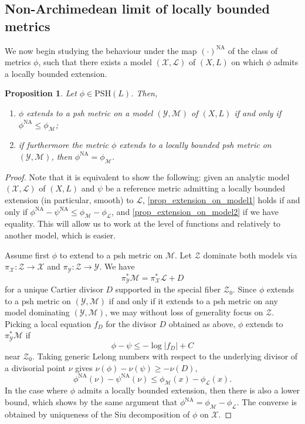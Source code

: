 \documentclass[JEP,XML,SOM,Unicode,NoEqCountersInSection,published]{cedram}
\newtheorem{prop}[theorem]{Proposition}
\theoremstyle{definition}
\newcommand\cL{\mathcal{L}}
\newcommand\cM{\mathcal{M}}
\newcommand\cX{\mathcal{X}}
\newcommand\cY{\mathcal{Y}}
\newcommand\cZ{\mathcal{Z}}
\newcommand\PSH{\mathrm{PSH}}
\newcommand\na{^{\mathrm{NA}}}
\begin{document}
\subsection{Non-Archimedean limit of locally bounded metrics}\label{subsect_25}

We now begin studying the behaviour under the map $(\cdot)\na$ of the class of metrics $\phi$, such that there exists a model $(\cX,\cL)$ of $(X,L)$ on which $\phi$ admits a locally bounded extension.

\begin{prop}\label{prop_extension_on_model}
Let $\phi\in\PSH(L)$. Then,
\begin{enumerate}
\item\label{prop_extension_on_model1} $\phi$ extends to a psh metric on a model $(\cY,\cM)$ of $(X,L)$ if and only if $\phi\na\leq \phi_\cM$;
\item\label{prop_extension_on_model2} if furthermore the metric $\phi$ extends to a locally bounded psh metric on $(\cY,\cM)$, then $\phi\na=\phi_\cM$.
\end{enumerate}
\end{prop}
\begin{proof}
Note that it is equivalent to show the following: given an analytic model $(\cX,\cL)$ of $(X,L)$ and $\psi$ be a reference metric admitting a locally bounded extension (in particular, smooth) to $\cL$,
\eqref{prop_extension_on_model1} holds if and only if $\phi\na-\psi\na\leq \phi_\cM - \phi_\cL$, and \eqref{prop_extension_on_model2} if we have equality. This will allow us to work at the level of functions and relatively to another model, which is easier.

Assume first $\phi$ to extend to a psh metric on $\cM$. Let $\cZ$ dominate both models via $\pi_\cX:\cZ\to\cX$ and $\pi_\cY:\cZ\to \cY$. We have
\[
\pi_\cY^*\cM=\pi_\cX^*\cL+D
\]
for a unique Cartier divisor $D$ supported in the special fiber $\cZ_0$. Since $\phi$ extends to a psh metric on $(\cY,\cM)$ if and only if it extends to a psh metric on any model dominating $(\cY,\cM)$, we may without loss of generality focus on $\cZ$. Picking a local equation $f_D$ for the divisor $D$ obtained as above, $\phi$ extends to $\pi_\cY^*\cM$ if
\[
\phi-\psi\leq -\log|f_D| + C
\]
near $\cZ_0$. Taking generic Lelong numbers with respect to the underlying divisor of a divisorial point $\nu$ gives
$\nu(\phi)-\nu(\psi) \geq -\nu(D),$
\ie
\[
\phi\na(\nu)-\psi\na(\nu)\leq \phi_\cM(x)-\phi_\cL(x).
\]
In the case where $\phi$ admits a locally bounded extension, then there is also a lower bound, which shows by the same argument that $\phi\na=\phi_\cM-\phi_\cL$. The converse is obtained by uniqueness of the Siu decomposition of $\phi$ on $\cX$.
\end{proof}
\end{document}
